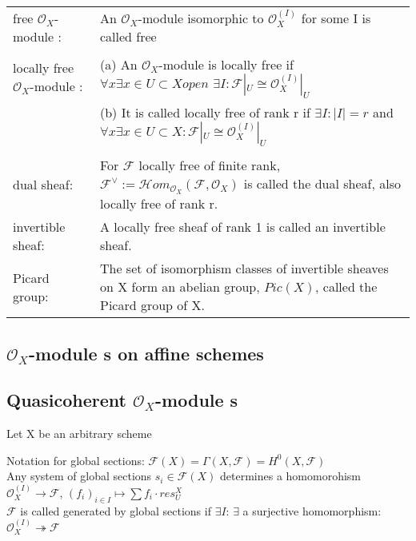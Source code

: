 \documentclass[a4paper, 12pt]{article}
\newcommand{\ca}[1]{\mathcal{#1}}
\newcommand{\caf}{\mathcal{F}}
\newcommand{\oxmod}{$\mathcal{O}_X$-module }
\newcommand{\ox}{\mathcal{O}_X}
\begin{document}
\begin{tabular}{p{4cm} p{12cm}}

free \oxmod: & An \oxmod   isomorphic to $\ox^{(I)}$ for some I is called free\\

&\\

locally free \oxmod: 

   &(a)  An \oxmod is locally free if $\forall x  \exists  x\in U \subset X open $ $\exists I : \caf|_U \cong \ox^{(I)}|_U$\\
   &(b)  It is called locally free of rank r if $\exists I : |I| = r $   and $ \forall x \exists x \in U \subset X : \caf|_U \cong \ox^{(I)}|_U$\\
\\

dual sheaf: & For $\caf$ locally free of finite rank, $\caf^{\vee} := \ca{H}om_{\ox}(\caf, \ox)$ is called the dual sheaf, also locally free of rank r.\\


invertible sheaf: & A locally free sheaf of rank 1 is called an invertible sheaf.\\


Picard group: & The set of isomorphism classes of invertible sheaves on X form an abelian group, $Pic(X)$, called the Picard group of X.\\


\end{tabular}

\subsection{\oxmod s on affine schemes}

\subsection{Quasicoherent \oxmod s }

Let X be an arbitrary scheme

Notation for global sections:
$\caf(X) = \Gamma(X, \caf) = H^0(X,\caf)$
\\

Any system of global sections $s_i \in \caf(X)$ determines a homomorohism $\ox^{(I)}\longrightarrow\caf$, $(f_i)_{i\in I }\longmapsto \sum f_i \cdot  res^{X}_{U}$\\

$\caf$ is called generated by global sections if $\exists I $: $\exists$ a surjective homomorphism:  $\ox^{(I)}\twoheadrightarrow \caf$ 
\\
\end{document}
